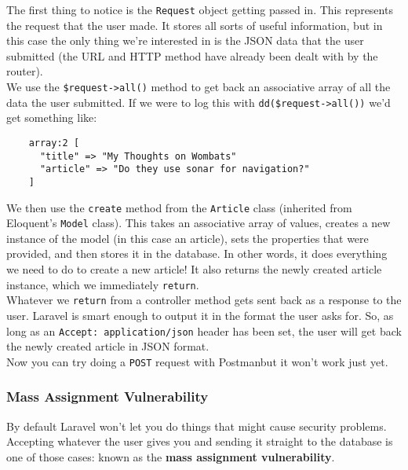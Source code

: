 
The first thing to notice is the \texttt{Request} object getting passed in. This represents the request that the user made. It stores all sorts of useful information, but in this case the only thing we're interested in is the JSON data that the user submitted (the URL and HTTP method have already been dealt with by the router).
\\

We use the \texttt{\$request->all()} method to get back an associative array of all the data the user submitted. If we were to log this with \texttt{dd(\$request->all())} we'd get something like:

\begin{verbatim}
    array:2 [
      "title" => "My Thoughts on Wombats"
      "article" => "Do they use sonar for navigation?"
    ]
\end{verbatim}

We then use the \texttt{create} method from the \texttt{Article} class (inherited from Eloquent's \texttt{Model} class). This takes an associative array of values, creates a new instance of the model (in this case an article), sets the properties that were provided, and then stores it in the database. In other words, it does everything we need to do to create a new article! It also returns the newly created article instance, which we immediately \texttt{return}.
\\

Whatever we \texttt{return} from a controller method gets sent back as a response to the user. Laravel is smart enough to output it in the format the user asks for. So, as long as an \texttt{Accept: application/json} header has been set, the user will get back the newly created article in JSON format.
\\

Now you can try doing a \texttt{POST} request with Postman\textellipsis{ }but it won't work just yet.


\subsubsection{Mass Assignment Vulnerability}
By default Laravel won't let you do things that might cause security problems. Accepting whatever the user gives you and sending it straight to the database is one of those cases: known as the \textbf{mass assignment vulnerability}.
\\

